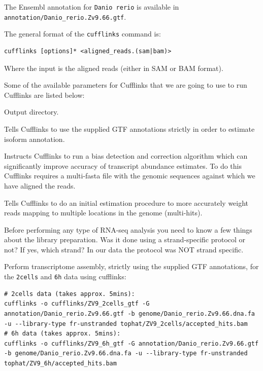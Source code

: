 The Ensembl annotation for \texttt{Danio rerio} is available in
\texttt{annotation/Danio\_rerio.Zv9.66.gtf}.

\begin{information}
The general format of the \texttt{cufflinks} command is:
\begin{lstlisting}[style=command_syntax]
cufflinks [options]* <aligned_reads.(sam|bam)>
\end{lstlisting}
Where the input is the aligned reads (either in SAM or BAM format).
\end{information}

\begin{note}
Some of the available parameters for Cufflinks that we are going to use to run
Cufflinks are listed below:
\begin{description}[style=multiline,labelindent=0cm,align=right,leftmargin=\descriptionlabelspace,rightmargin=1.5cm,font=\ttfamily]
  \item[-o] Output directory.
  \item[-G] Tells Cufflinks to use the supplied GTF annotations strictly in order
  to estimate isoform annotation.
  \item[-b] Instructs Cufflinks to run a bias detection and correction algorithm
  which can significantly improve accuracy of transcript abundance estimates.
  To do this Cufflinks requires a multi-fasta file with the genomic sequences
  against which we have aligned the reads.
  \item[-u] Tells Cufflinks to do an initial estimation procedure to more
  accurately weight reads mapping to multiple locations in the genome
  (multi-hits).
  \item[--library-type] Before performing any type of RNA-seq analysis you need
  to know a few things about the library preparation. Was it done using a
  strand-specific protocol or not? If yes, which strand? In our data the protocol
  was NOT strand specific.
\end{description}
\end{note}

\begin{steps}
Perform transcriptome assembly, strictly using the supplied GTF annotations, for the \texttt{2cells} and \texttt{6h} data using cufflinks:
\begin{lstlisting}
# 2cells data (takes approx. 5mins):
cufflinks -o cufflinks/ZV9_2cells_gtf -G annotation/Danio_rerio.Zv9.66.gtf -b genome/Danio_rerio.Zv9.66.dna.fa -u --library-type fr-unstranded tophat/ZV9_2cells/accepted_hits.bam
# 6h data (takes approx. 5mins):
cufflinks -o cufflinks/ZV9_6h_gtf -G annotation/Danio_rerio.Zv9.66.gtf -b genome/Danio_rerio.Zv9.66.dna.fa -u --library-type fr-unstranded tophat/ZV9_6h/accepted_hits.bam
\end{lstlisting}
\end{steps}

